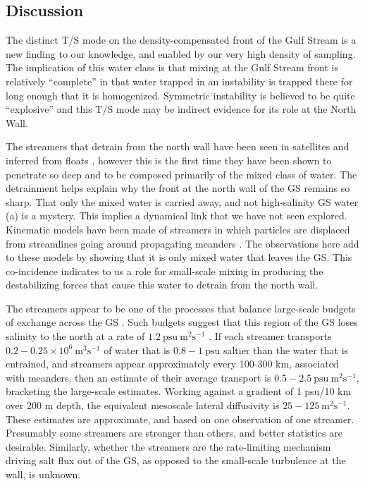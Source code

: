 \documentclass[draft,grl]{agutex2015}
\begin{document}
\begin{article}
\section{Discussion}

The distinct T/S mode on the density-compensated front of the Gulf Stream is a new finding to our knowledge, and enabled by our very high density of sampling.  The implication of this water class is that mixing at the Gulf Stream front is relatively ``complete'' in that water trapped in an instability is trapped there for long enough that it is homogenized.  Symmetric instability is believed to be quite ``explosive'' and this T/S mode may be indirect evidence for its role at the North Wall\citep{dasaroetal11}.    

The streamers that detrain from the north wall have been seen in satellites and inferred from floats \citep{bowerrossby89,flierletal87,lozieretal97,songetal95}, however this is the first time they have been shown to penetrate so deep and to be composed primarily of the mixed class of water.   The detrainment helps explain why the front at the north wall of the GS remains so sharp.  That only the mixed water is carried away, and not high-salinity GS water (a) is a mystery.  This implies a dynamical link that we have not seen explored.  Kinematic models have been made of streamers in which particles are displaced from streamlines going around propagating meanders \citep{bower91,prattetal95,lozieretal97}. The observations here add to these models by showing that it is only mixed water that leaves the GS.  This co-incidence indicates to us a role for small-scale mixing in producing the destabilizing forces that cause this water to detrain from the north wall.  

The streamers appear to be one of the processes that balance large-scale budgets of exchange across the GS \citep{joyceetal13,boweretal85}. Such budgets suggest that this region of the GS loses salinity to the north at a rate of $1.2\ \mathrm{psu\  m^2 s^{-1}}$  \citep{joyceetal13}.  If each streamer transports $0.2-0.25 \times 10^6\ \mathrm{m^3 s^{-1}}$ of water that is $0.8-1\ \mathrm{psu}$ saltier than the water that is entrained, and streamers appear approximately every 100-300 km, associated with meanders, then an estimate of their average transport is $0.5- 2.5\ \mathrm{psu\ m^2s^{-1}}$, bracketing the large-scale estimates.  Working against a gradient of 1 psu/10 km over 200 m depth, the equivalent mesoscale lateral diffusivity is $25-125\ \mathrm{m^2s^{-1}}$.  These estimates are approximate, and based on one observation of one streamer.  Presumably some streamers are stronger than others, and better statistics are desirable. Similarly, whether the streamers are the rate-limiting mechanism driving salt flux out of the GS, as opposed to the small-scale turbulence at the wall, is unknown.  


\end{article}
\end{document}
